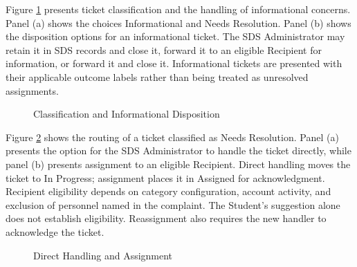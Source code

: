 Figure \ref{fig:class} presents ticket classification and the handling of informational concerns. Panel (a) shows the choices Informational and Needs Resolution. Panel (b) shows the disposition options for an informational ticket. The SDS Administrator may retain it in SDS records and close it, forward it to an eligible Recipient for information, or forward it and close it. Informational tickets are presented with their applicable outcome labels rather than being treated as unresolved assignments.

\renewcommand{\thefigure}{5.24}
\begin{figure}[htbp]
    \centering
    \par{}\par
    \medskip
    \par{}\par
    \caption{Classification and Informational Disposition}
    \label{fig:class}
\end{figure}
\FloatBarrier

Figure \ref{fig:assign} shows the routing of a ticket classified as Needs Resolution. Panel (a) presents the option for the SDS Administrator to handle the ticket directly, while panel (b) presents assignment to an eligible Recipient. Direct handling moves the ticket to In Progress; assignment places it in Assigned for acknowledgment. Recipient eligibility depends on category configuration, account activity, and exclusion of personnel named in the complaint. The Student's suggestion alone does not establish eligibility. Reassignment also requires the new handler to acknowledge the ticket.

\renewcommand{\thefigure}{5.25}
\begin{figure}[htbp]
    \centering
    \par{}\par
    \medskip
    \par{}\par
    \caption{Direct Handling and Assignment}
    \label{fig:assign}
\end{figure}
\FloatBarrier

